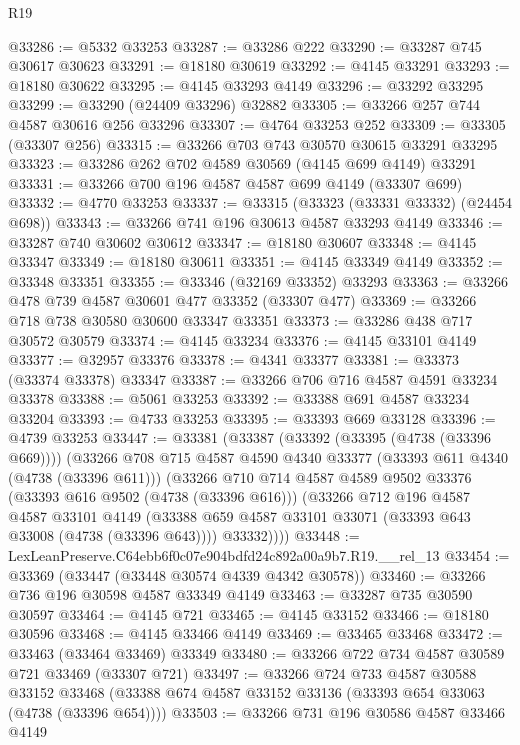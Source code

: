 \begin{lexlean}{R19}
\begin{coremodule}
@33286 := @5332 @33253
@33287 := @33286 @222
@33290 := @33287 @745 @30617 @30623
@33291 := @18180 @30619
@33292 := @4145 @33291
@33293 := @18180 @30622
@33295 := @4145 @33293 @4149
@33296 := @33292 @33295
@33299 := @33290 (@24409 @33296) @32882
@33305 := @33266 @257 @744 @4587 @30616 @256 @33296
@33307 := @4764 @33253 @252
@33309 := @33305 (@33307 @256)
@33315 := @33266 @703 @743 @30570 @30615 @33291 @33295
@33323 := @33286 @262 @702 @4589 @30569 (@4145 @699 @4149) @33291
@33331 := @33266 @700 @196 @4587 @4587 @699 @4149 (@33307 @699)
@33332 := @4770 @33253
@33337 := @33315 (@33323 (@33331 @33332) (@24454 @698))
@33343 := @33266 @741 @196 @30613 @4587 @33293 @4149
@33346 := @33287 @740 @30602 @30612
@33347 := @18180 @30607
@33348 := @4145 @33347
@33349 := @18180 @30611
@33351 := @4145 @33349 @4149
@33352 := @33348 @33351
@33355 := @33346 (@32169 @33352) @33293
@33363 := @33266 @478 @739 @4587 @30601 @477 @33352 (@33307 @477)
@33369 := @33266 @718 @738 @30580 @30600 @33347 @33351
@33373 := @33286 @438 @717 @30572 @30579
@33374 := @4145 @33234
@33376 := @4145 @33101 @4149
@33377 := @32957 @33376
@33378 := @4341 @33377
@33381 := @33373 (@33374 @33378) @33347
@33387 := @33266 @706 @716 @4587 @4591 @33234 @33378
@33388 := @5061 @33253
@33392 := @33388 @691 @4587 @33234 @33204
@33393 := @4733 @33253
@33395 := @33393 @669 @33128
@33396 := @4739 @33253
@33447 := @33381
    (@33387
      (@33392 (@33395 (@4738 (@33396 @669))))
      (@33266
        @708
        @715
        @4587
        @4590
        @4340
        @33377
        (@33393 @611 @4340 (@4738 (@33396 @611)))
        (@33266
          @710
          @714
          @4587
          @4589
          @9502
          @33376
          (@33393 @616 @9502 (@4738 (@33396 @616)))
          (@33266
            @712
            @196
            @4587
            @4587
            @33101
            @4149
            (@33388 @659 @4587 @33101 @33071 (@33393 @643 @33008 (@4738 (@33396 @643))))
            @33332))))
@33448 := LexLeanPreserve.C64ebb6f0c07e904bdfd24c892a00a9b7.R19.__rel_13
@33454 := @33369 (@33447 (@33448 @30574 @4339 @4342 @30578))
@33460 := @33266 @736 @196 @30598 @4587 @33349 @4149
@33463 := @33287 @735 @30590 @30597
@33464 := @4145 @721
@33465 := @4145 @33152
@33466 := @18180 @30596
@33468 := @4145 @33466 @4149
@33469 := @33465 @33468
@33472 := @33463 (@33464 @33469) @33349
@33480 := @33266 @722 @734 @4587 @30589 @721 @33469 (@33307 @721)
@33497 := @33266
    @724
    @733
    @4587
    @30588
    @33152
    @33468
    (@33388 @674 @4587 @33152 @33136 (@33393 @654 @33063 (@4738 (@33396 @654))))
@33503 := @33266 @731 @196 @30586 @4587 @33466 @4149

\end{coremodule}
\end{lexlean}
